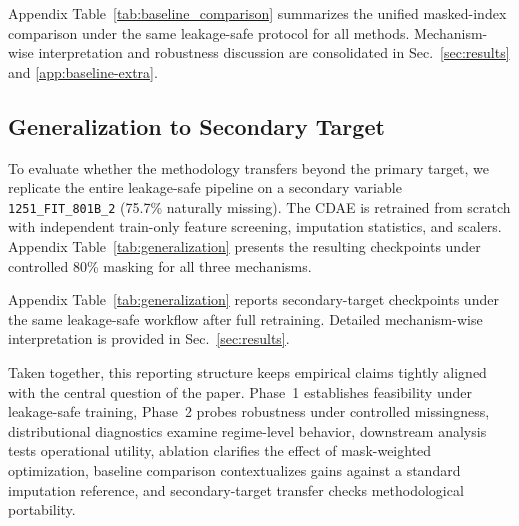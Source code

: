 Appendix Table~\ref{tab:baseline_comparison} summarizes the unified masked-index comparison under the same leakage-safe protocol for all methods. Mechanism-wise interpretation and robustness discussion are consolidated in Sec.~\ref{sec:results} and \ref{app:baseline-extra}.

\subsection{Generalization to Secondary Target}\label{sec:generalization}

To evaluate whether the methodology transfers beyond the primary target, we replicate the entire leakage-safe pipeline on a secondary variable \texttt{1251\_FIT\_801B\_2} (75.7\% naturally missing). The CDAE is retrained from scratch with independent train-only feature screening, imputation statistics, and scalers. Appendix Table~\ref{tab:generalization} presents the resulting checkpoints under controlled 80\% masking for all three mechanisms.

Appendix Table~\ref{tab:generalization} reports secondary-target checkpoints under the same leakage-safe workflow after full retraining. Detailed mechanism-wise interpretation is provided in Sec.~\ref{sec:results}.

Taken together, this reporting structure keeps empirical claims tightly aligned with the central question of the paper. Phase~1 establishes feasibility under leakage-safe training, Phase~2 probes robustness under controlled missingness, distributional diagnostics examine regime-level behavior, downstream analysis tests operational utility, ablation clarifies the effect of mask-weighted optimization, baseline comparison contextualizes gains against a standard imputation reference, and secondary-target transfer checks methodological portability.
